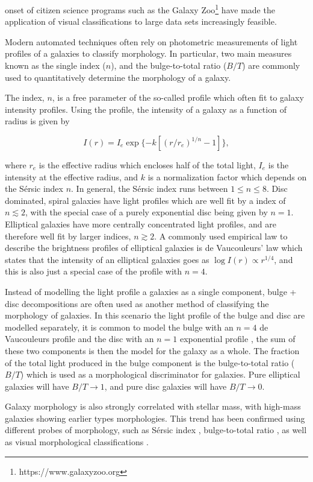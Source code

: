 onset of citizen science programs such as the Galaxy
Zoo\footnote{https://www.galaxyzoo.org} \citep{lintott2008} have made
the application of visual classifications to large data sets
increasingly feasible.
\par
Modern automated techniques often rely on photometric measurements of 
light profiles of a galaxies to classify morphology.  In particular, two
main measures known as the single \ser index ($n$), and the
bulge-to-total ratio ($B/T$) are commonly used to quantitatively determine
the morphology of a galaxy.
\par
The \ser index, $n$, is a free parameter of the so-called
\ser profile \citep{sersic1968} which often fit to galaxy
intensity profiles.  Using the \ser profile, the intensity of a
galaxy as a function of radius is given by 

\begin{equation}
  I(r) = I_e \exp \{-k [(r/r_e)^{1/n} - 1]\},
\end{equation}

\noindent
where $r_e$ is the effective radius which encloses half of the total
light, $I_e$ is the intensity at the effective radius, and $k$ is a
normalization factor which depends on the S{\'e}rsic index $n$.  In
general, the S{\'e}rsic index runs between $1 \le n \le 8$.  Disc
dominated, spiral galaxies have light profiles which are well fit by a
\ser index of $n \lesssim 2$, with the special case of a purely
exponential disc being given by $n=1$.  Elliptical galaxies have more
centrally concentrated light profiles, and are therefore well fit by
larger \ser indices, $n \gtrsim 2$.  A commonly used empirical law to
describe the brightness profiles of elliptical galaxies is de
Vaucouleurs' law which states that the intensity of an elliptical
galaxies goes as $\log I(r) \propto r^{1/4}$, and this is also just a
special case of the \ser profile with $n=4$.
\par
Instead of modelling the light profile a galaxies as a single
component, bulge + disc decompositions are often used as another
method of classifying the morphology of galaxies.  In this scenario
the light profile of the bulge and disc are modelled separately, it is
common to model the bulge with an $n=4$ de Vaucouleurs profile and the
disc with an $n=1$ exponential profile \citep[e.g.][]{simard2002}, the
sum of these two
components is then the model for the galaxy as a whole.  The fraction
of the total light produced in the bulge component is the bulge-to-total ratio
($B/T$) which is used as a morphological discriminator for galaxies.
Pure elliptical galaxies will have $B/T \to 1$, and pure disc galaxies
will have $B/T \to 0$.
\par
Galaxy morphology is also strongly correlated with stellar mass, with
high-mass galaxies showing earlier types morphologies.  This trend has
been confirmed using different probes of morphology, such as
S{\'e}rsic index \citep{vanderwel2008}, bulge-to-total ratio
\citep{bluck2014}, as well as visual morphological classifications
\citep{bamford2009}.  

